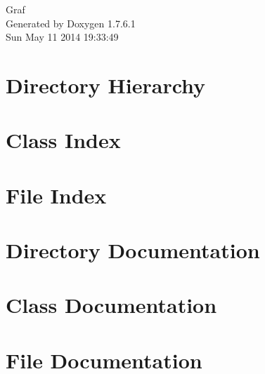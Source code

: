 \documentclass[a4paper]{book}
\begin{document}
\hypersetup{pageanchor=false,citecolor=blue}
\begin{titlepage}
\vspace*{7cm}
\begin{center}
{\Large \-Graf }\\
\vspace*{1cm}
{\large \-Generated by Doxygen 1.7.6.1}\\
\vspace*{0.5cm}
{\small Sun May 11 2014 19:33:49}\\
\end{center}
\end{titlepage}
\clearemptydoublepage
{}
\tableofcontents
\clearemptydoublepage
{}
\hypersetup{pageanchor=true,citecolor=blue}
\chapter{\-Directory \-Hierarchy}

\chapter{\-Class \-Index}

\chapter{\-File \-Index}

\chapter{\-Directory \-Documentation}

\chapter{\-Class \-Documentation}




\chapter{\-File \-Documentation}







\printindex
\end{document}

